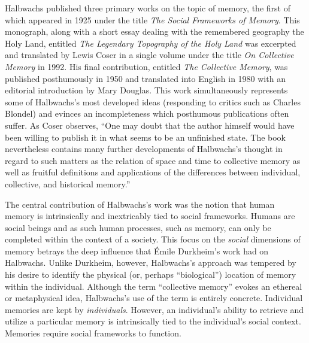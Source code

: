 Halbwachs published three primary works on the topic of memory, the
first of which appeared in 1925 under the title \emph{The Social
Frameworks of Memory}.\autocite{halbwachs1925} This monograph, along
with a short essay dealing with the remembered geography the Holy Land,
entitled \emph{The Legendary Topography of the Holy
Land}\autocite{halbwachs1941} was excerpted and translated by Lewis
Coser in a single volume under the title \emph{On Collective Memory} in
1992.\autocite[Several of the most important chapters of \emph{The
Social Frameworks of Memory} were included in full. Likewise, the
entirety of the conclusion of \emph{The Legendary Topography} was
included][]{halbwachs1992} His final contribution, entitled \emph{The
Collective Memory}, was published posthumously in 1950 and translated
into English in 1980 with an editorial introduction by Mary
Douglas.\autocite{halbwachs1980} This work simultaneously represents
some of Halbwachs's most developed ideas (responding to critics such as
Charles Blondel) and evinces an incompleteness which posthumous
publications often suffer. As Coser observes, ``One may doubt that the
author himself would have been willing to publish it in what seems to be
an unfinished state. The book nevertheless contains many further
developments of Halbwachs's thought in regard to such matters as the
relation of space and time to collective memory as well as fruitful
definitions and applications of the differences between individual,
collective, and historical memory.''\autocite{coser_halbwachs1992}

The central contribution of Halbwachs's work was the notion that human
memory is intrinsically and inextricably tied to social frameworks.
Humans are social beings and as such human processes, such as memory,
can only be completed within the context of a society. This focus on the
\emph{social} dimensions of memory betrays the deep influence that Émile
Durkheim's work had on Halbwachs. Unlike Durkheim, however, Halbwachs's
approach was tempered by his desire to identify the physical (or,
perhaps ``biological'') location of memory within the individual.
Although the term ``collective memory'' evokes an ethereal or
metaphysical idea, Halbwachs's use of the term is entirely concrete.
Individual memories are kept by \emph{individuals}. However, an
individual's ability to retrieve and utilize a particular memory is
intrinsically tied to the individual's social context. Memories require
social frameworks to function.\autocite[38]{halbwachs1992}


